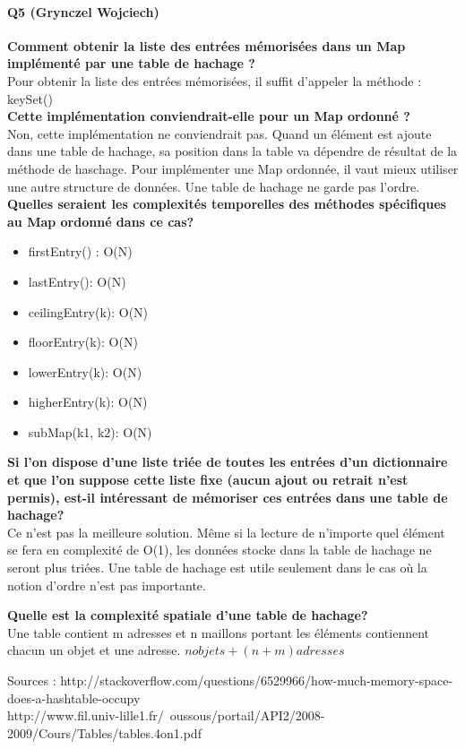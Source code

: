 \documentclass[a4paper]{article}
\begin{document}
\paragraph{Q5 (Grynczel Wojciech)} 
\textbf{Comment obtenir la liste des entrées mémorisées dans un Map implémenté par une table de hachage ?}\\
Pour obtenir la liste des entrées mémorisées, il suffit d'appeler la méthode : keySet()\\
\textbf{Cette implémentation conviendrait-elle pour un Map ordonné ?}\\
Non, cette implémentation ne conviendrait pas. Quand un élément est ajoute dans une table de hachage,  sa position dans la table va dépendre de résultat de la méthode de haschage. Pour implémenter une Map ordonnée, il vaut mieux utiliser une autre structure de données.
Une table de hachage ne garde pas l'ordre.\\  
\textbf{Quelles seraient les complexités temporelles des méthodes spéciﬁques au Map ordonné dans ce cas?}\\
\begin{itemize}
	\item firstEntry() : O(N)
	\item lastEntry(): O(N)
	\item ceilingEntry(k): O(N)
	\item floorEntry(k): O(N)
	\item lowerEntry(k): O(N)
	\item higherEntry(k): O(N)
	\item subMap(k1, k2): O(N)
\end{itemize}

\textbf{Si l’on dispose d’une liste triée de toutes les entrées d’un dictionnaire et que l’on suppose cette liste ﬁxe (aucun ajout ou retrait n’est permis), est-il intéressant de mémoriser ces entrées dans une table de hachage?}\\
Ce n’est pas la meilleure solution. Même si la lecture de n’importe quel élément se fera en complexité de O(1), les données stocke dans la table de hachage ne seront plus triées.  
Une table de hachage est utile seulement dans le cas où la notion d’ordre n’est pas importante.

\textbf{ Quelle est la complexité spatiale d’une table de hachage?}\\
Une table contient m adresses et n maillons portant les éléments contiennent chacun un objet et une adresse.
$ n objets + (n + m) adresses $

{\small Sources : 
http://stackoverflow.com/questions/6529966/how-much-memory-space-does-a-hashtable-occupy\\
http://www.fil.univ-lille1.fr/~oussous/portail/API2/2008-2009/Cours/Tables/tables.4on1.pdf}
\end{document}
